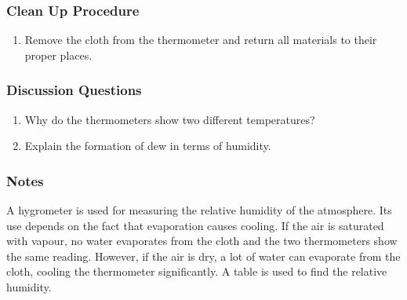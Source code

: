 \subsubsection*{Clean Up Procedure}
\begin{enumerate}
\item{Remove the cloth from the thermometer and return all materials to their proper places.}
\end{enumerate}

\subsubsection*{Discussion Questions}
\begin{enumerate}
\item{Why do the thermometers show two different temperatures?}
\item{Explain the formation of dew in terms of humidity.}
\end{enumerate}

\subsubsection*{Notes}
A hygrometer is used for measuring the relative humidity of the atmosphere.  Its use depends on the fact that evaporation causes cooling.  If the air is saturated with vapour, no water evaporates from the cloth and the two thermometers show the same reading.  However, if the air is dry, a lot of water can evaporate from the cloth, cooling the thermometer significantly.  A table is used to find the relative humidity.
